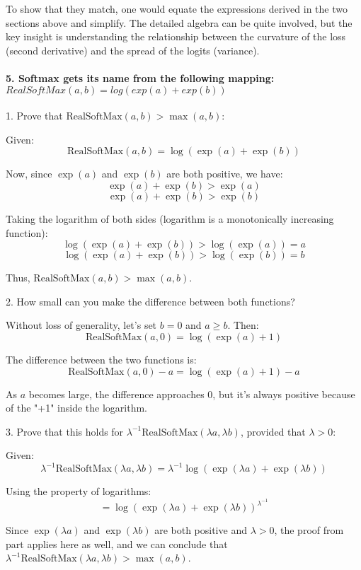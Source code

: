 To show that they match, one would equate the expressions derived in the two sections above and simplify.
The detailed algebra can be quite involved, but the key insight is understanding the relationship between the curvature of the loss (second derivative) and the spread of the logits (variance).


\paragraph{5. Softmax gets its name from the following mapping: \(RealSoftMax(a, b) = log(exp(a) + exp(b))\)}

1. Prove that \( \textrm{RealSoftMax}(a, b) > \max(a, b) \):

Given:
\[ \textrm{RealSoftMax}(a, b) = \log(\exp(a) + \exp(b)) \]

Now, since \( \exp(a) \) and \( \exp(b) \) are both positive, we have:
\[ \exp(a) + \exp(b) > \exp(a) \]
\[ \exp(a) + \exp(b) > \exp(b) \]

Taking the logarithm of both sides (logarithm is a monotonically increasing function):
\[ \log(\exp(a) + \exp(b)) > \log(\exp(a)) = a \]
\[ \log(\exp(a) + \exp(b)) > \log(\exp(b)) = b \]

Thus, \( \text{RealSoftMax}(a, b) > \max(a, b) \).

2. How small can you make the difference between both functions?

Without loss of generality, let's set \( b = 0 \) and \( a \geq b \). Then:
\[ \textrm{RealSoftMax}(a, 0) = \log(\exp(a) + 1) \]

The difference between the two functions is:
\[ \textrm{RealSoftMax}(a, 0) - a = \log(\exp(a) + 1) - a \]

As \( a \) becomes large, the difference approaches 0, but it's always positive because of the "+1" inside the logarithm.

3. Prove that this holds for \( \lambda^{-1} \textrm{RealSoftMax}\left(\lambda a, \lambda b\right) \), provided that \( \lambda > 0 \):

Given:
\[ \lambda^{-1} \textrm{RealSoftMax}\left(\lambda a, \lambda b\right) = \lambda^{-1} \log(\exp(\lambda a) + \exp(\lambda b)) \]

Using the property of logarithms:
\[ = \log(\exp(\lambda a) + \exp(\lambda b))^{\lambda^{-1}} \]

Since \( \exp(\lambda a) \) and \( \exp(\lambda b) \) are both positive and \( \lambda > 0 \), the proof from part  applies here as well, and we can conclude that \( \lambda^{-1} \textrm{RealSoftMax}(\lambda a, \lambda b) > \max(a, b) \).

